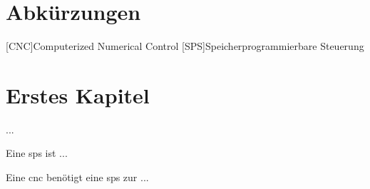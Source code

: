 \documentclass[12pt,a4paper]{scrbook}
\begin{document}
\tableofcontents

\chapter*{Abkürzungen}
\begin{acronym}
	[CNC]{Computerized Numerical Control}
	[SPS]{Speicherprogrammierbare Steuerung}
\end{acronym}

\chapter{Erstes Kapitel}
...

Eine \ac{sps} ist ... 

Eine \ac{cnc} benötigt eine \ac{sps} zur ... 
\end{document}

